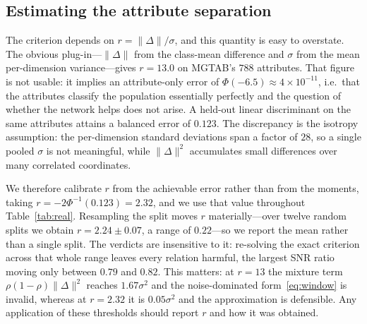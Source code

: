 \documentclass[onecolumn,pdflatex,sn-basic,Numbered]{sn-jnl}
\theoremstyle{thmstyleone}
\theoremstyle{thmstylethree}
\begin{document}
\subsection{Estimating the attribute separation}
\label{sec:r-estimate}

The criterion depends on $r = \|\Delta\|/\sigma$, and this quantity is easy to
overstate. The obvious plug-in---$\|\Delta\|$ from the class-mean difference and
$\sigma$ from the mean per-dimension variance---gives $r = 13.0$ on MGTAB's $788$
attributes. That figure is not usable: it implies an attribute-only error of
$\Phi(-6.5) \approx 4\times10^{-11}$, i.e.\ that the attributes classify the
population essentially perfectly and the question of whether the network helps does
not arise. A held-out linear discriminant on the same attributes attains a balanced
error of $0.123$. The discrepancy is the isotropy assumption: the per-dimension
standard deviations span a factor of $28$, so a single pooled $\sigma$ is not
meaningful, while $\|\Delta\|^2$ accumulates small differences over many correlated
coordinates.

We therefore calibrate $r$ from the achievable error rather than from the moments,
taking $r = -2\Phi^{-1}(0.123) = 2.32$, and we use that value throughout
Table~\ref{tab:real}. Resampling the split moves $r$ materially---over twelve random splits we obtain $r = 2.24 \pm 0.07$, a range of $0.22$---so we report the mean rather than a single split. The verdicts are insensitive to it: re-solving the exact criterion across that whole range leaves every relation harmful, the largest SNR ratio moving only between $0.79$ and $0.82$. This matters: at $r = 13$ the mixture term
$\rho(1-\rho)\|\Delta\|^2$ reaches $1.67\sigma^2$ and the noise-dominated
form~\eqref{eq:window} is invalid, whereas at $r = 2.32$ it is $0.05\sigma^2$ and the
approximation is defensible. Any application of these thresholds should report $r$
and how it was obtained.
\end{document}
